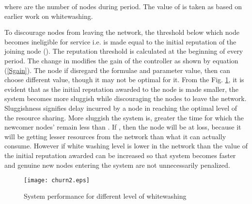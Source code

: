 \documentclass[journal]{IEEEtran}
\begin{document}
where  are the number of nodes during  period. The value of  is taken as  based on earlier work \cite{Satsiou} on whitewashing.

To discourage nodes from leaving the network, the threshold below which node becomes ineligible for service i.e.  is made equal to the initial reputation of the joining node ().  The reputation threshold is calculated at the beginning of every period. The change in  modifies the gain  of the controller as shown by equation (\ref{Sgain}). The node if disregard the formulae and parameter value, then can choose different  value, though it may not be optimal for it. From the Fig. \ref{whitewashing}, it is evident that as the initial reputation awarded to the node is made smaller, the system becomes more sluggish while discouraging the nodes to leave the network. Sluggishness signifies delay incurred by a node in reaching the optimal level of the resource sharing. More sluggish the system is, greater the time for which the newcomer nodes'  remain less than . If , then the node will be at loss, because it will be getting  lesser resources from the network than what it can actually consume. However if white washing level is lower in the network than the value of the initial reputation awarded can be increased so that system becomes faster and genuine new nodes entering the system are not unnecessarily penalized. 
\begin{figure}[!t]
	\begin{center}
		\texttt{[image: churn2.eps]}
		\caption{System performance for different level of whitewashing }
		\label{whitewashing}
	\end{center}
\end{figure}  
\end{document}
